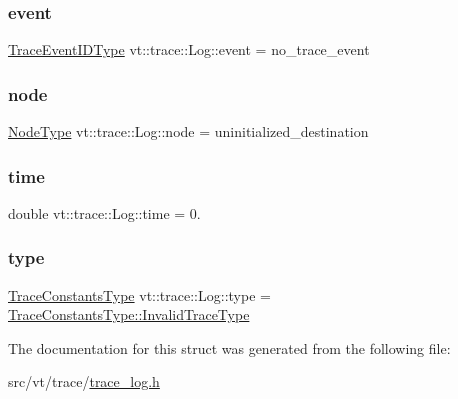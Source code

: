 \mbox{\label{structvt_1_1trace_1_1_log_a88aa88893277f0feb9776e96048a9294}} 
\subsubsection{\texorpdfstring{event}{event}}
{\footnotesize\ttfamily \hyperlink{namespacevt_1_1trace_a64a7185f3e102df8d8258f263ccd1582}{Trace\+Event\+I\+D\+Type} vt\+::trace\+::\+Log\+::event = no\+\_\+trace\+\_\+event}

\mbox{\label{structvt_1_1trace_1_1_log_a39a932cb9c4775f83117d0be477bc8c8}} 
\subsubsection{\texorpdfstring{node}{node}}
{\footnotesize\ttfamily \hyperlink{namespacevt_a866da9d0efc19c0a1ce79e9e492f47e2}{Node\+Type} vt\+::trace\+::\+Log\+::node = uninitialized\+\_\+destination}

\mbox{\label{structvt_1_1trace_1_1_log_a91a7891f5f287385c1323053e3c675c0}} 
\subsubsection{\texorpdfstring{time}{time}}
{\footnotesize\ttfamily double vt\+::trace\+::\+Log\+::time = 0.}

\mbox{\label{structvt_1_1trace_1_1_log_a6415eacd3721d71029ff6edb909fc63d}} 
\subsubsection{\texorpdfstring{type}{type}}
{\footnotesize\ttfamily \hyperlink{namespacevt_1_1trace_acf454dfbd581b0ebae895f90b5927a1d}{Trace\+Constants\+Type} vt\+::trace\+::\+Log\+::type = \hyperlink{namespacevt_1_1trace_acf454dfbd581b0ebae895f90b5927a1da319f6b5fbfb85275879d449149167c7e}{Trace\+Constants\+Type\+::\+Invalid\+Trace\+Type}}



The documentation for this struct was generated from the following file\+:\begin{DoxyCompactItemize}
\item 
src/vt/trace/\hyperlink{trace__log_8h}{trace\+\_\+log.\+h}\end{DoxyCompactItemize}
